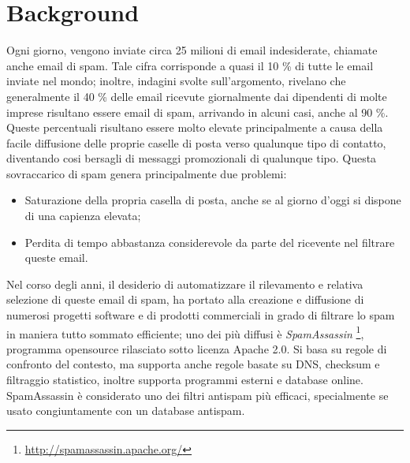 \section{Background}\label{Background}
Ogni giorno, vengono inviate circa 25 milioni di email indesiderate, chiamate anche email di spam. Tale cifra corrisponde a quasi il 10 \% di tutte le email inviate nel mondo; inoltre, indagini svolte sull'argomento, rivelano che generalmente il 40 \% delle email ricevute giornalmente dai dipendenti di molte imprese risultano essere email di spam, arrivando in alcuni casi, anche al 90 \%.
Queste percentuali risultano essere molto elevate principalmente a causa della facile diffusione delle proprie caselle di posta verso qualunque tipo di contatto, diventando cosi bersagli di messaggi promozionali di qualunque tipo. Questa sovraccarico di spam genera principalmente due problemi:
\begin{itemize}
\item Saturazione della propria casella di posta, anche se al giorno d'oggi si dispone di una capienza elevata;
\item Perdita di tempo abbastanza considerevole da parte del ricevente nel filtrare queste email.
\end{itemize}
Nel corso degli anni, il desiderio di automatizzare il rilevamento e relativa selezione di queste email di spam, ha portato alla creazione e diffusione di numerosi progetti software e di prodotti commerciali in grado di filtrare lo spam in maniera tutto sommato efficiente; uno dei più diffusi è \textit{SpamAssassin} \footnote{\url{http://spamassassin.apache.org/}}, programma opensource rilasciato sotto licenza Apache 2.0. Si basa su regole di confronto del contesto, ma supporta anche regole basate su DNS, checksum e filtraggio statistico, inoltre supporta programmi esterni e database online.
SpamAssassin è considerato uno dei filtri antispam più efficaci, specialmente se usato congiuntamente con un database antispam.\cite{wiki:SpamAssassin}

